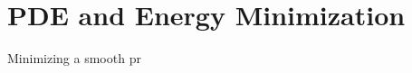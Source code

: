                                                                       
                                                                      
                                                                      
\section{PDE and Energy Minimization}

Minimizing a smooth pr
